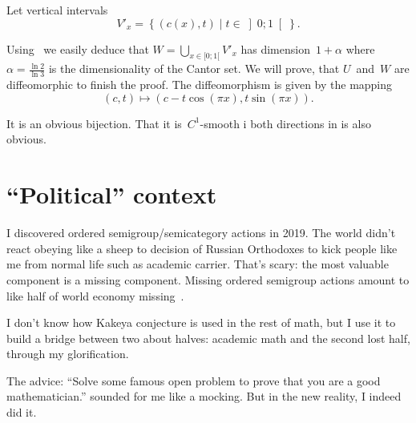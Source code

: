 \documentclass[oneside,draft]{amsart}
\newcommand{\setcond}[2]{\left\{#1\mid#2\right\}}
\begin{document}
Let vertical intervals \[ V'_x = \setcond{(c(x), t)}{t\in\left]0;1\right[}. \]

Using~\cite{189275} we easily deduce that $W=\bigcup_{x\in[0;1[}V'_x$ has dimension~$1+\alpha$ where $\alpha=\frac{\ln 2}{\ln 3}$ is the dimensionality of the Cantor set. We will prove, that $U$~and~$W$ are diffeomorphic to finish the proof. The diffeomorphism is given by the mapping \[ (c,t) \mapsto (c-t\cos(\pi x), t\sin(\pi x)). \]

It is an obvious bijection. That it is~$C^1$-smooth i both directions in is also obvious.

\section{``Political'' context}

I discovered ordered semigroup/semicategory actions in 2019. The world didn't react obeying like a sheep to decision of Russian Orthodoxes to kick people like me from normal life such as academic carrier. That's scary: the most valuable component is a missing component. Missing ordered semigroup actions amount to like half of world economy missing~\cite{osa-important}.

I don't know how Kakeya conjecture is used in the rest of math, but I use it to build a bridge between two about halves: academic math and the second lost half, through my glorification.

The advice: ``Solve some famous open problem to prove that you are a good mathematician.'' sounded for me like a mocking. But in the new reality, I indeed did it.



\end{document}
